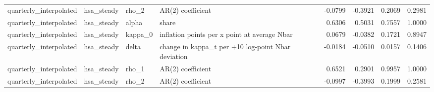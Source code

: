 \begin{tabular}{llllrrrr}
quarterly\_interpolated & hsa\_steady & rho\_2 & AR(2) coefficient & -0.0799 & -0.3921 & 0.2069 & 0.2981 \\
quarterly\_interpolated & hsa\_steady & alpha & share & 0.6306 & 0.5031 & 0.7557 & 1.0000 \\
quarterly\_interpolated & hsa\_steady & kappa\_0 & inflation points per x point at average Nbar & 0.0679 & -0.0382 & 0.1721 & 0.8947 \\
quarterly\_interpolated & hsa\_steady & delta & change in kappa\_t per +10 log-point Nbar deviation & -0.0184 & -0.0510 & 0.0157 & 0.1406 \\
quarterly\_interpolated & hsa\_steady & rho\_1 & AR(2) coefficient & 0.6521 & 0.2901 & 0.9957 & 1.0000 \\
quarterly\_interpolated & hsa\_steady & rho\_2 & AR(2) coefficient & -0.0997 & -0.3993 & 0.1999 & 0.2581 \\
\bottomrule
\end{tabular}
